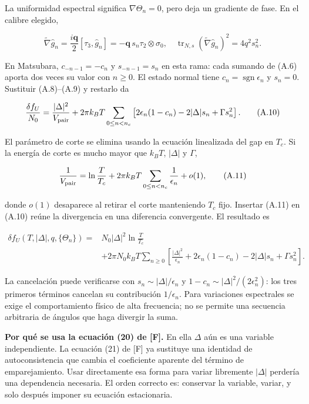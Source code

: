 \documentclass[
  spanish,
  10pt,
  a4paper,
]{article}
\begin{document}
La uniformidad espectral significa \(\nabla\Theta_n=0\), pero deja un
gradiente de fase. En el calibre elegido,

\[
\widetilde\nabla\hat g_n
=\frac{i\mathbf q}{2}[\tau_3,\hat g_n]
=-\mathbf q\,s_n\tau_2\otimes\sigma_0,
\quad
\operatorname{tr}_{N,s}(\widetilde\nabla\hat g_n)^2
=4q^2s_n^2.
\tag{A.9}
\]

En Matsubara, \(c_{-n-1}=-c_n\) y \(s_{-n-1}=s_n\) en esta rama: cada
sumando de (A.6) aporta dos veces su valor con \(n\geq0\). El estado
normal tiene \(c_n=\operatorname{sgn}\epsilon_n\) y \(s_n=0\). Sustituir
(A.8)--(A.9) y restarlo da

\[
\frac{\delta f_U}{N_0}
=\frac{|\Delta|^2}{V_{\rm pair}}
+2\pi k_BT\sum_{0\leq n<n_c}
\left[2\epsilon_n(1-c_n)-2|\Delta|s_n+\Gamma s_n^2\right].
\tag{A.10}
\]

El parámetro de corte se elimina usando la ecuación linealizada del gap
en \(T_c\). Si la energía de corte es mucho mayor que \(k_BT\),
\(|\Delta|\) y \(\Gamma\),

\[
\frac{1}{V_{\rm pair}}
=\ln\frac{T}{T_c}
+2\pi k_BT\sum_{0\leq n<n_c}\frac{1}{\epsilon_n}
+o(1),
\tag{A.11}
\]

donde \(o(1)\) desaparece al retirar el corte manteniendo \(T_c\) fijo.
Insertar (A.11) en (A.10) reúne la divergencia en una diferencia
convergente. El resultado es

\[
\begin{aligned}
\delta f_U(T,|\Delta|,q,\{\Theta_n\})
={}&N_0|\Delta|^2\ln\frac{T}{T_c}\\
&+2\pi N_0k_BT\sum_{n\geq0}
\left[\frac{|\Delta|^2}{\epsilon_n}
+2\epsilon_n(1-c_n)-2|\Delta|s_n+\Gamma s_n^2\right].
\end{aligned}
\tag{A.12}
\]

La cancelación puede verificarse con \(s_n\sim|\Delta|/\epsilon_n\) y
\(1-c_n\sim|\Delta|^2/(2\epsilon_n^2)\): los tres primeros términos
cancelan su contribución \(1/\epsilon_n\). Para variaciones espectrales
se exige el comportamiento físico de alta frecuencia; no se permite una
secuencia arbitraria de ángulos que haga divergir la suma.

\textbf{Por qué se usa la ecuación (20) de {[}F{]}.} En ella \(\Delta\)
aún es una variable independiente. La ecuación (21) de {[}F{]} ya
sustituye una identidad de autoconsistencia que cambia el coeficiente
aparente del término de emparejamiento. Usar directamente esa forma para
variar libremente \(|\Delta|\) perdería una dependencia necesaria. El
orden correcto es: conservar la variable, variar, y solo después imponer
su ecuación estacionaria.
\end{document}
